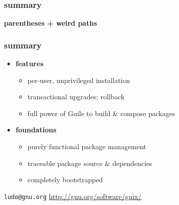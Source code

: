 \documentclass{beamer}
\begin{document}





\begin{frame}
  \frametitle{summary}

  \bf \huge{parentheses + weird paths}
\end{frame}

\begin{frame}
  \frametitle{summary}

  \begin{itemize}
  \item \textbf{features}
    \begin{itemize}
    \item per-user, unprivileged installation
    \item transactional upgrades; rollback
    \item full power of Guile to build \& compose packages
    \end{itemize}
  \item \textbf{foundations}
    \begin{itemize}
    \item purely functional package management
    \item traceable package source \& dependencies
    \item completely bootstrapped
    \end{itemize}
  \end{itemize}
\end{frame}

\begin{frame}{}

\vfill{
  \vspace{7cm}
  \texttt{ludo@gnu.org} \hfill{\alert{\url{http://gnu.org/software/guix/}}}
}

\end{frame}
\end{document}
